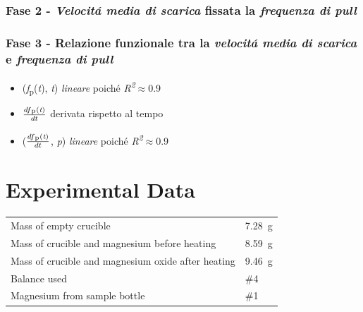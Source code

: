 \documentclass{article}
\begin{document}
\subsubsection{Fase 2 - \textit{Velocit\'a media di scarica} fissata la \textit{frequenza di pull}}

\subsubsection{Fase 3 - Relazione funzionale tra la \textit{velocit\'a media di scarica} e \textit{frequenza di pull}}

\begin{itemize}
\item{(\textit{f}\textsubscript{p}(\textit{t}), \textit{t})  \textit{lineare} poich\'e \textit{R\textsuperscript{2}}\(\approx\)0.9}
\item{\(\frac{df\textsubscript{p}(\textit{t})}{dt}\)  derivata rispetto al tempo}
\item{(\(\frac{df\textsubscript{p}(\textit{t})}{dt}\), \textit{p})  \textit{lineare} poich\'e \textit{R\textsuperscript{2}}\(\approx\)0.9} 
\end{itemize}



\section{Experimental Data}

\begin{tabular}{ll}
Mass of empty crucible & \SI{7.28}{\gram}\\
Mass of crucible and magnesium before heating & \SI{8.59}{\gram}\\
Mass of crucible and magnesium oxide after heating & \SI{9.46}{\gram}\\
Balance used & \#4\\
Magnesium from sample bottle & \#1
\end{tabular}

\end{document}
